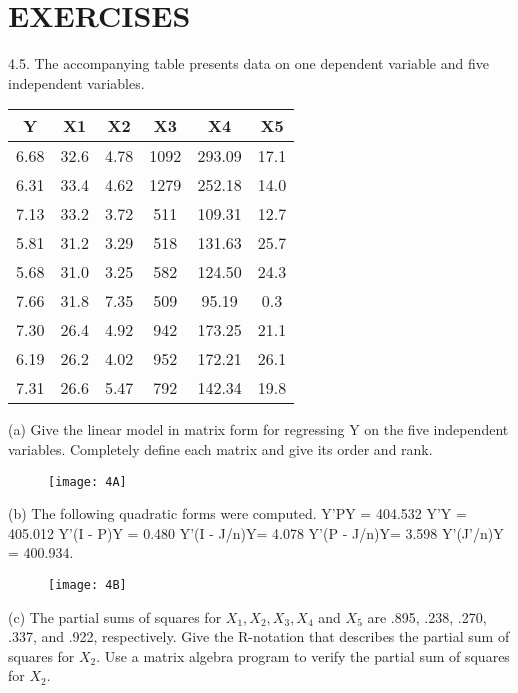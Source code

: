 \documentclass[letterpaper,11pt]{article}
\begin{document}
{\section{EXERCISES}

4.5. The accompanying table presents data on one dependent variable and five independent variables.

\bigskip

\begin{tabular}{|c c c c c c|} 

 \hline
	Y 	 & X1 	& X2 	 & X3 	& X4 		 & X5	 \\
 \hline\hline
	6.68 & 32.6 & 4.78 & 1092 & 293.09 & 17.1 \\
	6.31 & 33.4 & 4.62 & 1279 & 252.18 & 14.0 \\
	7.13 & 33.2 & 3.72 &  511 & 109.31 & 12.7 \\
	5.81 & 31.2 & 3.29 &  518 & 131.63 & 25.7 \\
	5.68 & 31.0 & 3.25 &  582 & 124.50 & 24.3 \\
	7.66 & 31.8 & 7.35 &  509 &  95.19 &  0.3 \\
	7.30 & 26.4 & 4.92 &  942 & 173.25 & 21.1 \\
	6.19 & 26.2 & 4.02 &  952 & 172.21 & 26.1 \\
	7.31 & 26.6 & 5.47 &  792 & 142.34 & 19.8 \\
 \hline

\end{tabular}

\bigskip

(a) Give the linear model in matrix form for regressing Y on the five independent variables. Completely define each matrix and
give its order and rank. 

	\begin{figure}[htbp]
	\centering
	\texttt{[image: 4A]}
	\end{figure}

(b) The following quadratic forms were computed.
Y'PY = 404.532 
Y'Y = 405.012
Y'(I - P)Y = 0.480 
Y'(I - J/n)Y= 4.078
Y'(P - J/n)Y= 3.598 
Y'(J'/n)Y = 400.934.

	\begin{figure}[htbp]
	\centering
	\texttt{[image: 4B]}
	\end{figure}
	
	
(c) The partial sums of squares for $X_{1}, X_{2}, X_{3}, X_{4}$ and $X_{5}$ are .895, .238, .270, .337, and .922, respectively. 
Give the R-notation that describes the partial sum of squares for $X_{2}$. Use a matrix algebra program to verify 
the partial sum of squares for $X_{2}$.
	
}
\end{document}
